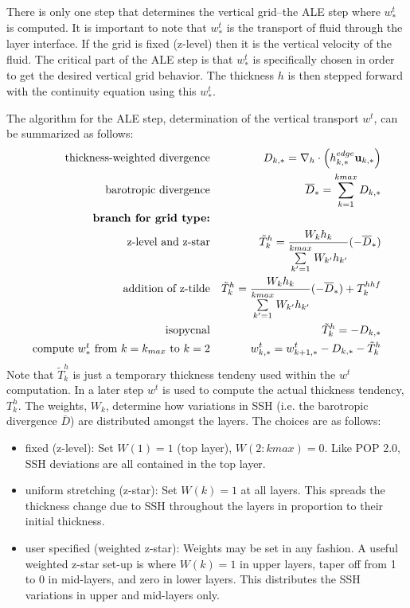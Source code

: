 \documentclass[11pt]{report}
\newcommand{\bea}{\begin{eqnarray}}
\newcommand{\eea}{\end{eqnarray}}
\begin{document}
There is only one step that determines the vertical grid--the ALE step where $w^t_*$ is computed.  It is important to note that $w^t_*$ is the transport of fluid through the layer interface.  If the grid is fixed (z-level) then it is the vertical velocity of the fluid.  The critical part of the ALE step is that $w^t_*$ is specifically chosen in order to get the desired vertical grid behavior.  The thickness $h$ is then stepped forward with the continuity equation using this $w^t_*$.

The algorithm for the ALE step, determination of the vertical transport $w^t$, can be summarized as follows:
\bea
\mbox{thickness-weighted divergence} && D_{k,*} = \nabla_h \cdot  \left( h^{edge}_{k,*} {\bf u}_{k,*} \right)  \label{D1a} \\
\mbox{barotropic divergence} && {\overline D}_* = \sum\limits_{k=1}^{kmax} D_{k,*}  \\
\mbox{\bf branch for grid type:} &&  \\
\mbox{z-level and z-star} && {\tilde T}^h_k = \frac{W_k h_k}{\sum\limits_{k'=1}^{kmax} W_{k'} h_{k'}}(-{\overline D}_*)\\
\mbox{addition of z-tilde} && {\tilde T}^h_k = \frac{W_k h_k}{\sum\limits_{k'=1}^{kmax} W_{k'} h_{k'}}(-{\overline D}_*) + T^{hhf}_k\\
\mbox{isopycnal} && {\tilde T}^h_k = - D_{k,*}\\
\mbox{compute $w^t_*$ from $k=k_{max}$ to $k=2$} && w^t_{k,*} = w^t_{k+1,*} - D_{k,*} - {\tilde T}^h_k 
\eea
Note that ${\tilde T}^h_k$ is just a temporary thickness tendeny used within the $w^t$ computation.  In a later step $w^t$ is used to compute the actual thickness tendency, $T^h_k$.  The weights, $W_k$, determine how variations in SSH (i.e. the barotropic divergence ${\overline D}$) are distributed amongst the layers.  The choices are as follows:
\begin{itemize}
\item fixed (z-level): Set $W(1)=1$ (top layer), $W(2:kmax)=0$.  Like POP 2.0, SSH deviations are all contained in the top layer.  
\item uniform stretching (z-star): Set $W(k)=1$ at all layers.  This spreads the thickness change due to SSH throughout the layers in proportion to their initial thickness.
\item user specified (weighted z-star): Weights may be set in any fashion.  A useful weighted z-star set-up is where $W(k)=1$ in upper layers, taper off from 1 to 0 in mid-layers, and zero in lower layers.  This distributes the SSH variations in upper and mid-layers only.
\end{itemize}
\end{document}
